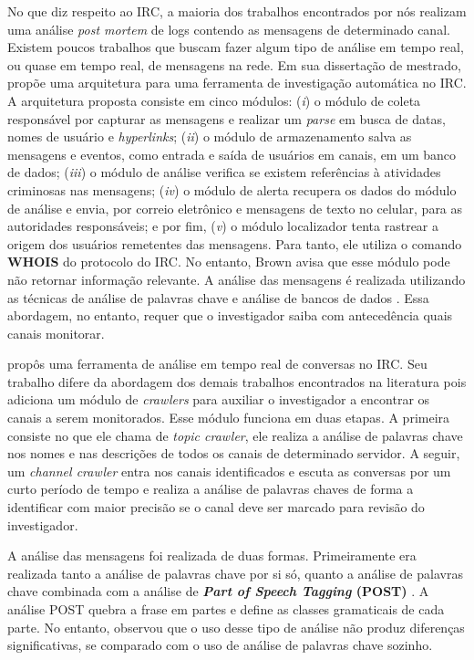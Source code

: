 \documentclass[12pt]{article}
\begin{document}
No que diz respeito ao IRC, a maioria dos trabalhos encontrados por nós
realizam uma análise \textit{post mortem} de logs contendo as mensagens de
determinado canal.
%
Existem poucos trabalhos que buscam fazer algum tipo de análise em tempo real,
ou quase em tempo real, de mensagens na rede.
%
Em sua dissertação de mestrado,  propõe uma arquitetura para
uma ferramenta de investigação automática no IRC. A arquitetura proposta
consiste em cinco módulos: (\textit{i}) o módulo de coleta responsável por
capturar as mensagens e realizar um \textit{parse} em busca de datas, nomes
de usuário e \textit{hyperlinks};
%
(\textit{ii}) o módulo de armazenamento
salva as mensagens e eventos, como entrada e saída de usuários em canais, em
um banco de dados;
%
(\textit{iii}) o módulo de análise verifica se existem referências à atividades
criminosas nas mensagens;
%
(\textit{iv}) o módulo de alerta recupera os dados do módulo de análise e envia,
por correio eletrônico e mensagens de texto no celular, para as autoridades responsáveis;
%
e por fim, (\textit{v}) o módulo localizador tenta rastrear a origem dos
usuários remetentes das mensagens. Para tanto, ele utiliza o comando \textbf{WHOIS} do
protocolo do IRC. No entanto, Brown avisa que esse módulo pode não
retornar informação relevante.
%
A análise das mensagens é realizada utilizando as técnicas de análise de
palavras chave e análise de bancos de dados \cite{brown2007}.
%
Essa abordagem, no entanto, requer que o investigador saiba com antecedência
quais canais monitorar.

 propôs uma ferramenta de análise em tempo real de
conversas no IRC. Seu trabalho difere da abordagem dos demais trabalhos
encontrados na literatura pois adiciona um módulo de \textit{crawlers} para
auxiliar o investigador a encontrar os canais a serem monitorados.
%
Esse módulo funciona em duas etapas. A primeira consiste no que ele chama de
\textit{topic crawler}, ele realiza a análise de palavras chave nos nomes e
nas descrições de todos os canais de determinado servidor. A seguir, um
\textit{channel crawler} entra nos canais identificados e escuta as conversas
por um curto período de tempo e realiza a análise de palavras chaves de forma
a identificar com maior precisão se o canal deve ser marcado para revisão do
investigador.

A análise das mensagens foi realizada de duas formas. Primeiramente era
realizada tanto a análise de palavras chave por si só, quanto a análise de
palavras chave combinada com a análise de \textbf{\textit{Part of Speech
Tagging} (POST)} \cite{stanford}. A análise POST quebra a frase em partes e
define as classes gramaticais de cada parte. No entanto, 
observou que o uso desse tipo de análise não produz diferenças significativas,
se comparado com o uso de análise de palavras chave sozinho.
\end{document}
